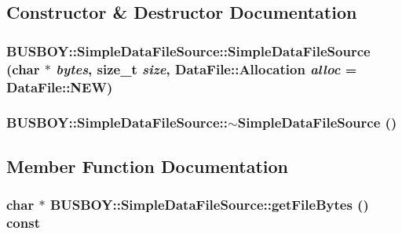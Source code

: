 \subsection{Constructor \& Destructor Documentation}
\hypertarget{classBUSBOY_1_1SimpleDataFileSource_a9a3def3020e88a029993d45ada5e6529}{
\subsubsection[{SimpleDataFileSource}]{\setlength{\rightskip}{0pt plus 5cm}BUSBOY::SimpleDataFileSource::SimpleDataFileSource (char $\ast$ {\em bytes}, \/  size\_\-t {\em size}, \/  {\bf DataFile::Allocation} {\em alloc} = {\ttfamily DataFile::NEW})}}
\label{classBUSBOY_1_1SimpleDataFileSource_a9a3def3020e88a029993d45ada5e6529}
\hypertarget{classBUSBOY_1_1SimpleDataFileSource_a0ce9aa80189e52f3c457ded051f1eaf8}{
\subsubsection[{$\sim$SimpleDataFileSource}]{\setlength{\rightskip}{0pt plus 5cm}BUSBOY::SimpleDataFileSource::$\sim$SimpleDataFileSource ()}}
\label{classBUSBOY_1_1SimpleDataFileSource_a0ce9aa80189e52f3c457ded051f1eaf8}


\subsection{Member Function Documentation}
\hypertarget{classBUSBOY_1_1SimpleDataFileSource_a6811ed0b59217747b60a7deffbf6f991}{
\subsubsection[{getFileBytes}]{\setlength{\rightskip}{0pt plus 5cm}char $\ast$ BUSBOY::SimpleDataFileSource::getFileBytes () const}}
\label{classBUSBOY_1_1SimpleDataFileSource_a6811ed0b59217747b60a7deffbf6f991}


